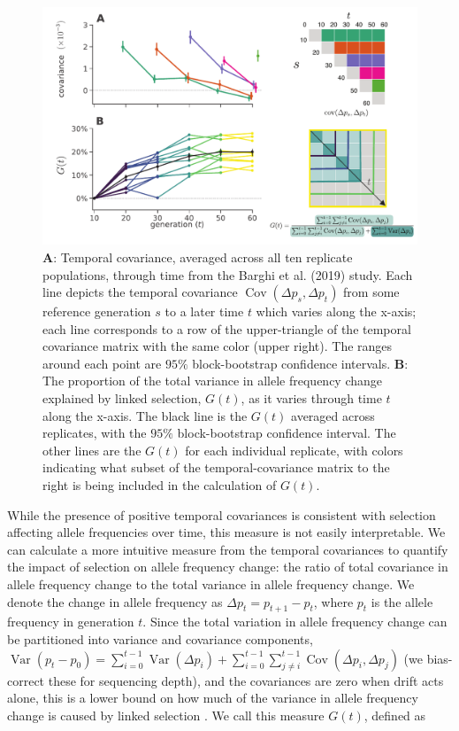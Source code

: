 \documentclass[9pt,twocolumn,twoside]{pnas-new}
\DeclareMathOperator{\var}{Var}
\DeclareMathOperator{\cov}{Cov}
\begin{document}
\begin{figure}
  \centering
  \includegraphics[width=15cm]{figure-1-pnas.pdf}

  \caption{{\bf A}: Temporal covariance, averaged across all ten replicate
    populations, through time from the Barghi et al. (2019) study. Each line
    depicts the temporal covariance $\cov(\Delta p_s, \Delta p_t)$ from some
    reference generation $s$ to a later time $t$ which varies along the x-axis;
    each line corresponds to a row of the upper-triangle of the temporal
    covariance matrix with the same color (upper right). The ranges around each
    point are $95\%$ block-bootstrap confidence intervals. {\bf B}: The
    proportion of the total variance in allele frequency change explained by
    linked selection, $G(t)$, as it varies through time $t$ along the x-axis.
    The black line is the $G(t)$ averaged across replicates, with the $95\%$
    block-bootstrap confidence interval. The other lines are the $G(t)$ for
    each individual replicate, with colors indicating what subset of the
    temporal-covariance matrix to the right is being included in the
  calculation of $G(t)$.}

  \label{fig:figure-1}
\end{figure}

While the presence of positive temporal covariances is consistent with
selection affecting allele frequencies over time, this measure is not easily
interpretable. We can calculate a more intuitive measure from the temporal
covariances to quantify the impact of selection on allele frequency change: the
ratio of total covariance in allele frequency change to the total variance in
allele frequency change. We denote the change in allele frequency as $\Delta
p_t = p_{t+1}-p_t$, where $p_t$ is the allele frequency in generation $t$.
Since the total variation in allele frequency change can be partitioned into
variance and covariance components, $\var(p_t - p_0) = \sum_{i=0}^{t-1}
  \var(\Delta p_i) + \sum_{i=0}^{t-1} \sum_{j \ne i}^{t-1} \cov(\Delta p_i,
\Delta p_j)$ (we bias-correct these for sequencing depth), and the
covariances are zero when drift acts alone, this is a lower bound on how much
of the variance in allele frequency change is caused by linked selection
\cite{Buffalo2019-io}. We call this measure $G(t)$, defined as
\end{document}
